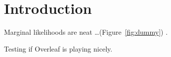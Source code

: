 \section{Introduction}

Marginal likelihoods are neat \ldots (Figure~\ref{fig:dummy}) \citep{Felsenstein1981}.

Testing if Overleaf is playing nicely.
